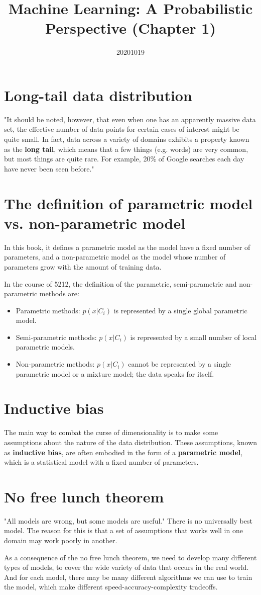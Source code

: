 \documentclass{article}
\title{Machine Learning: A Probabilistic Perspective (Chapter 1)}
\date{20201019}
\begin{document}
\section{Long-tail data distribution}
"It should be noted, however, that even when one has an apparently massive data set, the effective number of data points for certain cases of interest might be quite small. In fact, data across a variety of domains exhibits a property known as the \textbf{long tail}, which means that a few things (e.g. words) are very common, but most things are quite rare. For example, 20\% of Google searches each day have never been seen before."

\section{The definition of parametric model vs. non-parametric model}
In this book, it defines a parametric model as the model have a fixed number of parameters, and a non-parametric model as the model whose number of parameters grow with the amount of training data.

In the course of 5212, the definition of the parametric, semi-parametric and non-parametric methods are:
\begin{itemize}
    \item Parametric methods: $p(x | C_i)$ is represented by a single global parametric model.
    \item Semi-parametric methods: $p(x | C_i)$ is represented by a small number of local parametric models.
    \item Non-parametric methods: $p(x | C_i)$ cannot be represented by a single parametric model or a mixture model; the data speaks for itself.
\end{itemize}
\section{Inductive bias}
The main way to combat the curse of dimensionality is to make some assumptions about the nature of the data distribution.
These assumptions, known as \textbf{inductive bias}, are often embodied in the form of a \textbf{parametric model}, which is a statistical model with a fixed number of parameters.

\section{No free lunch theorem}
"All models are wrong, but some models are useful."
There is no universally best model. The reason for this is that a set of assumptions that works well in one domain may work poorly in another.

As a consequence of the no free lunch theorem, we need to develop many different types of models, to cover the wide variety of data that occurs in the real world. And for each model, there may be many different algorithms we can use to train the model, which make different speed-accuracy-complexity tradeoffs.
\end{document}
